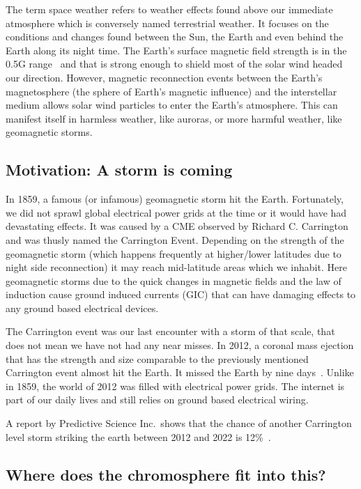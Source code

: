 \documentclass[12pt,upcase]{umlthesis}
\begin{document}
The term space weather refers to weather effects found above our immediate atmosphere which is conversely named terrestrial weather. It focuses on the conditions and changes found between the Sun, the Earth and even behind the Earth along its night time. The Earth's surface magnetic field strength is in the 0.5G range~\citep{Finlay2010} and that is strong enough to shield most of the solar wind headed our direction. However, magnetic reconnection events between the Earth's magnetosphere (the sphere of Earth's magnetic influence) and the interstellar medium allows solar wind particles to enter the Earth's atmosphere. This can manifest itself in harmless weather, like auroras, or more harmful weather, like geomagnetic storms.

\subsection{Motivation: A storm is coming}

In 1859, a famous (or infamous) geomagnetic storm hit the Earth. Fortunately, we did not sprawl global electrical power grids at the time or it would have had devastating effects. It was caused by a CME observed by Richard C. Carrington and was thusly named the Carrington Event. Depending on the strength of the geomagnetic storm (which happens frequently at higher/lower latitudes due to night side reconnection) it may reach mid-latitude areas which we inhabit. Here geomagnetic storms due to the quick changes in magnetic fields and the law of induction cause ground induced currents (GIC) that can have damaging effects to any ground based electrical devices.

The Carrington event was our last encounter with a storm of that scale, that does not mean we have not had any near misses. In 2012, a coronal mass ejection that has the strength and size comparable to the previously mentioned Carrington event almost hit the Earth. It missed the Earth by nine days~\citep{Baker2013}. Unlike in 1859, the world of 2012 was filled with electrical power grids. The internet is part of our daily lives and still relies on ground based electrical wiring.

A report by Predictive Science Inc.\ shows that the chance of another Carrington level storm striking the earth between 2012 and 2022 is 12\%~\citep{riley2012}.

\subsection{Where does the chromosphere fit into this?}
\end{document}
